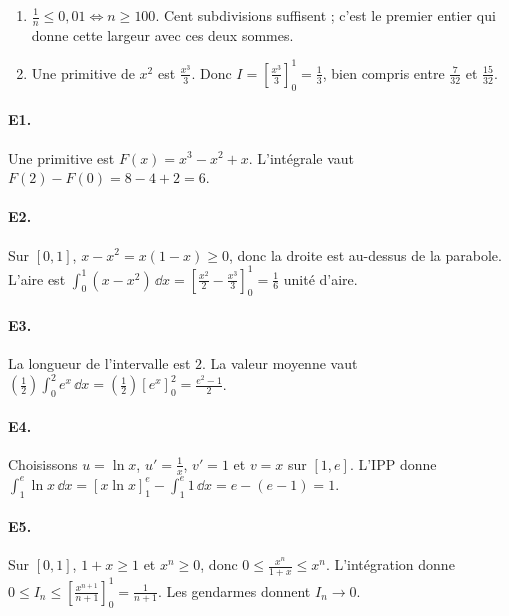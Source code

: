 \begin{enumerate}
\begin{lstlisting}
def rectangles_carre(n):
    h = 1/n
    bas = h*sum((k*h)**2 for k in range(n))
    haut = h*sum((k*h)**2 for k in range(1, n+1))
    return bas, haut
\end{lstlisting}
Les termes intérieurs se compensent : $U_n-L_n=(\frac{1}{n})(1^2-0^2)=\frac{1}{n}$.
\item $\frac{1}{n}\le0{,}01\Longleftrightarrow n\ge100$. Cent subdivisions suffisent ; c'est le premier entier qui donne cette largeur avec ces deux sommes.
\item Une primitive de $x^2$ est $\frac{x^3}{3}$. Donc $I=[\frac{x^3}{3}]_0^1=\frac{1}{3}$, bien compris entre $\frac{7}{32}$ et $\frac{15}{32}$.
\end{enumerate}

\paragraph{E1.}Une primitive est $F(x)=x^3-x^2+x$. L'intégrale vaut $F(2)-F(0)=8-4+2=6$.

\paragraph{E2.}Sur $[0,1]$, $x-x^2=x(1-x)\ge0$, donc la droite est au-dessus de la parabole. L'aire est $\int_0^1(x-x^2)\,\dd x=[\frac{x^2}{2}-\frac{x^3}{3}]_0^1=\frac{1}{6}$ unité d'aire.

\paragraph{E3.}La longueur de l'intervalle est $2$. La valeur moyenne vaut $(\frac{1}{2})\int_0^2e^x\,\dd x=(\frac{1}{2})[e^x]_0^2=\frac{e^2-1}{2}$.

\paragraph{E4.}Choisissons $u=\ln x$, $u'=\frac{1}{x}$, $v'=1$ et $v=x$ sur $[1,e]$. L'IPP donne $\int_1^e\ln x\,\dd x=[x\ln x]_1^e-\int_1^e1\,\dd x=e-(e-1)=1$.

\paragraph{E5.}Sur $[0,1]$, $1+x\ge1$ et $x^n\ge0$, donc $0\le \frac{x^n}{1+x}\le x^n$. L'intégration donne $0\le I_n\le[\frac{x^{n+1}}{n+1}]_0^1=\frac{1}{n+1}$. Les gendarmes donnent $I_n\to0$.

